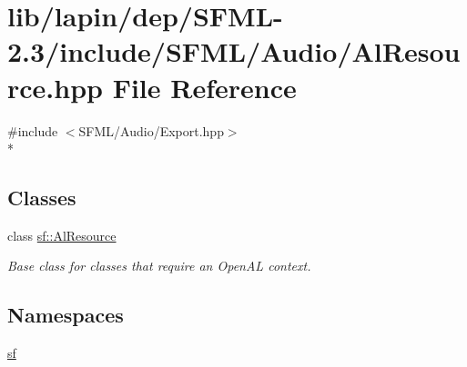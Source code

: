 \hypertarget{lapin_2dep_2_s_f_m_l-2_83_2include_2_s_f_m_l_2_audio_2_al_resource_8hpp}{\section{lib/lapin/dep/\-S\-F\-M\-L-\/2.3/include/\-S\-F\-M\-L/\-Audio/\-Al\-Resource.hpp File Reference}
\label{lapin_2dep_2_s_f_m_l-2_83_2include_2_s_f_m_l_2_audio_2_al_resource_8hpp}
}
{\ttfamily \#include $<$S\-F\-M\-L/\-Audio/\-Export.\-hpp$>$}\\*
\subsection*{Classes}
\begin{DoxyCompactItemize}
\item 
class \hyperlink{classsf_1_1_al_resource}{sf\-::\-Al\-Resource}
\begin{DoxyCompactList}\small\item\em Base class for classes that require an Open\-A\-L context. \end{DoxyCompactList}\end{DoxyCompactItemize}
\subsection*{Namespaces}
\begin{DoxyCompactItemize}
\item 
\hyperlink{namespacesf}{sf}
\end{DoxyCompactItemize}
